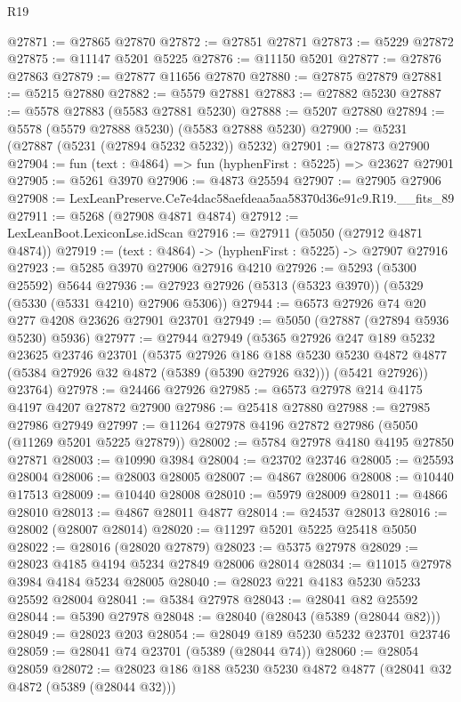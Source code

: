 \begin{lexlean}{R19}
\begin{coremodule}
@27871 := @27865 @27870
@27872 := @27851 @27871
@27873 := @5229 @27872
@27875 := @11147 @5201 @5225
@27876 := @11150 @5201
@27877 := @27876 @27863
@27879 := @27877 @11656 @27870
@27880 := @27875 @27879
@27881 := @5215 @27880
@27882 := @5579 @27881
@27883 := @27882 @5230
@27887 := @5578 @27883 (@5583 @27881 @5230)
@27888 := @5207 @27880
@27894 := @5578 (@5579 @27888 @5230) (@5583 @27888 @5230)
@27900 := @5231 (@27887 (@5231 (@27894 @5232 @5232)) @5232)
@27901 := @27873 @27900
@27904 := fun (text : @4864) => fun (hyphenFirst : @5225) => @23627 @27901
@27905 := @5261 @3970
@27906 := @4873 @25594
@27907 := @27905 @27906
@27908 := LexLeanPreserve.Ce7e4dac58aefdeaa5aa58370d36e91c9.R19.__fits_89
@27911 := @5268 (@27908 @4871 @4874)
@27912 := LexLeanBoot.LexiconLse.idScan
@27916 := @27911 (@5050 (@27912 @4871 @4874))
@27919 := (text : @4864) -> (hyphenFirst : @5225) -> @27907 @27916
@27923 := @5285 @3970 @27906 @27916 @4210
@27926 := @5293 (@5300 @25592) @5644
@27936 := @27923 @27926 (@5313 (@5323 @3970)) (@5329 (@5330 (@5331 @4210) @27906 @5306))
@27944 := @6573 @27926 @74 @20 @277 @4208 @23626 @27901 @23701
@27949 := @5050 (@27887 (@27894 @5936 @5230) @5936)
@27977 := @27944
    @27949
    (@5365
      @27926
      @247
      @189
      @5232
      @23625
      @23746
      @23701
      (@5375
        @27926
        @186
        @188
        @5230
        @5230
        @4872
        @4877
        (@5384 @27926 @32 @4872 (@5389 (@5390 @27926 @32)))
        (@5421 @27926))
      @23764)
@27978 := @24466 @27926
@27985 := @6573 @27978 @214 @4175 @4197 @4207 @27872 @27900
@27986 := @25418 @27880
@27988 := @27985 @27986 @27949
@27997 := @11264 @27978 @4196 @27872 @27986 (@5050 (@11269 @5201 @5225 @27879))
@28002 := @5784 @27978 @4180 @4195 @27850 @27871
@28003 := @10990 @3984
@28004 := @23702 @23746
@28005 := @25593 @28004
@28006 := @28003 @28005
@28007 := @4867 @28006
@28008 := @10440 @17513
@28009 := @10440 @28008
@28010 := @5979 @28009
@28011 := @4866 @28010
@28013 := @4867 @28011 @4877
@28014 := @24537 @28013
@28016 := @28002 (@28007 @28014)
@28020 := @11297 @5201 @5225 @25418 @5050
@28022 := @28016 (@28020 @27879)
@28023 := @5375 @27978
@28029 := @28023 @4185 @4194 @5234 @27849 @28006 @28014
@28034 := @11015 @27978 @3984 @4184 @5234 @28005
@28040 := @28023 @221 @4183 @5230 @5233 @25592 @28004
@28041 := @5384 @27978
@28043 := @28041 @82 @25592
@28044 := @5390 @27978
@28048 := @28040 (@28043 (@5389 (@28044 @82)))
@28049 := @28023 @203
@28054 := @28049 @189 @5230 @5232 @23701 @23746
@28059 := @28041 @74 @23701 (@5389 (@28044 @74))
@28060 := @28054 @28059
@28072 := @28023 @186 @188 @5230 @5230 @4872 @4877 (@28041 @32 @4872 (@5389 (@28044 @32)))

\end{coremodule}
\end{lexlean}
